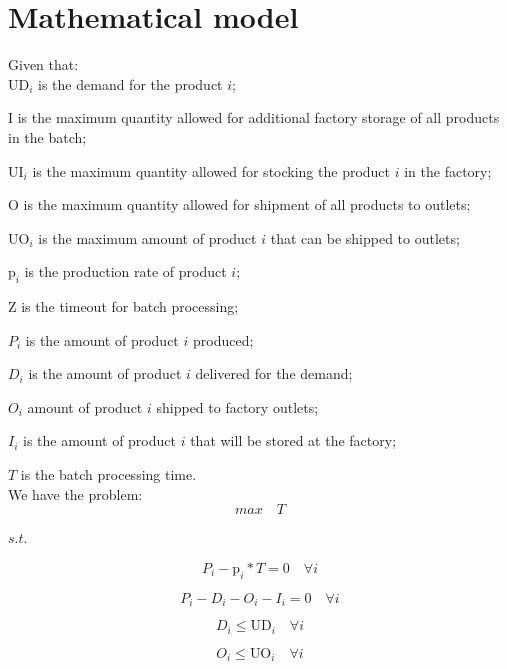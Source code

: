 \documentclass[authoryear,preprint,12pt]{elsarticle}
\begin{document}
\section{Mathematical model}
\label{sec:mathModel}

Given that: \\

$\textrm{UD}_i$ is the demand for the product $i$;

$\textrm{I}$ is the maximum quantity allowed for additional factory storage of all products in the batch;

$\textrm{UI}_i$ is the maximum quantity allowed for stocking the product $i$ in the factory;

$\textrm{O}$ is the maximum quantity allowed for shipment of all products to outlets;

$\textrm{UO}_i$ is the maximum amount of product $i$ that can be shipped to outlets;

$\textrm{p}_i$ is the production rate of product $i$;

$\textrm{Z}$ is the timeout for batch processing;

$P_i$ is the amount of product $i$ produced;

$D_i$ is the amount of product $i$ delivered for the demand;

$O_i$ amount of product $i$ shipped to factory outlets;

$I_i$ is the amount of product $i$ that will be stored at the factory;

$T$ is the batch processing time. \\

We have the problem: \\

\begin{equation}
max \quad T
\end{equation}

$s.t.$

\begin{equation}
P_i - \textrm{p}_i * T  = 0 \quad \forall i
\end{equation}

\begin{equation}
P_i - D_i - O_i - I_i = 0 \quad \forall i
\end{equation}

\begin{equation}
D_i \leq \textrm{UD}_i \quad \forall i
\end{equation}

\begin{equation}
O_i \leq \textrm{UO}_i \quad \forall i
\end{equation}
\end{document}
